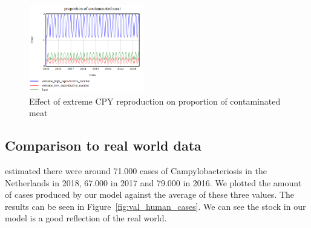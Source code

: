 \begin{figure}[h!]
    \centering
    \includegraphics[width=0.45\textwidth]{images/extremes/CPY_reproduction_contaminated_meat.png} 
    \caption{Effect of extreme CPY reproduction on proportion of contaminated meat}
    \label{fig:reproduction_meat}
\end{figure}


\subsection{Comparison to real world data}

\textcite{vlaanderen_staat_2019} estimated there were around 71.000 cases of Campylobacteriosis in the Netherlands in 2018, 67.000 in 2017 and 79.000 in 2016. We plotted the amount of cases produced by our model against the average of these three values. The results can be seen in Figure~\ref{fig:val_human_cases}. We can see the stock in our model is a good reflection of the real world. 

